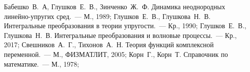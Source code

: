 \documentclass[a4paper, 12pt]{article}
\begin{document}
\begin{thebibliography}{999} 
    Бабешко~В.~А, Глушков~Е.~В., Зинченко~Ж.~Ф. Динамика неоднородных линейно-упругих сред.~---
    М., 1989;
    Глушков~Е.~В., Глушкова~Н.~В. Интегральные преобразования в теории упругости.~---
    Кр., 1990;
    Глушков~Е.~В., Глушкова~Н.~В. Интегральные преобразования и волновые процессы.~---
    Кр., 2017;
    Свешников~А.~Г., Тихонов~А.~Н. Теория функций комплексной переменной.~---
    М., ФИЗМАТЛИТ, 2005;
    Корн~Г., Корн~Т. Справочник по математике.~---
    М., 1978;
\end{thebibliography}
\end{document}
